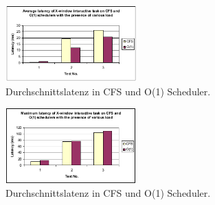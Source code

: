 \begin{figure}[h]
 	\centering
 	\includegraphics[width=0.45\textwidth]{pictures/avg_latency.png}
 	\caption{Durchschnittslatenz in CFS und O(1) Scheduler.}
 	\label{fig:avg_latency}
\end{figure}

\begin{figure}[h]
 	\centering
 	\includegraphics[width=0.45\textwidth]{pictures/max_latency.png}
 	\caption{Durchschnittslatenz in CFS und O(1) Scheduler.}
 	\label{fig:max_latency}
\end{figure}